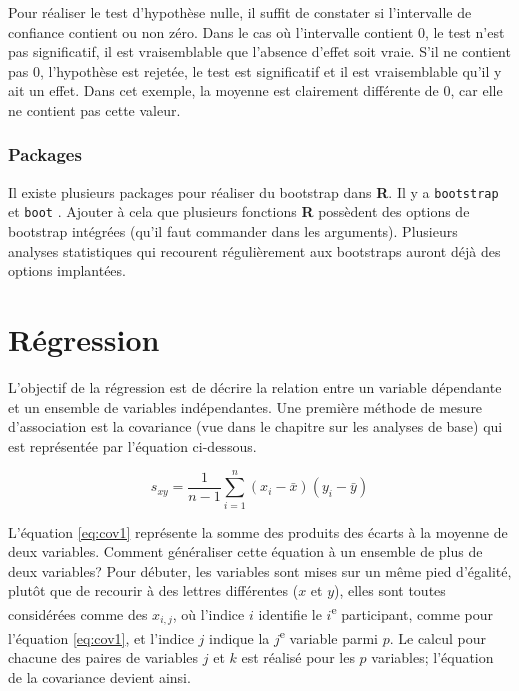 \documentclass[
]{book}
\begin{document}
Pour réaliser le test d'hypothèse nulle, il suffit de constater si l'intervalle de confiance contient ou non zéro. Dans le cas où l'intervalle contient 0, le test n'est pas significatif, il est vraisemblable que l'absence d'effet soit vraie. S'il ne contient pas 0, l'hypothèse est rejetée, le test est significatif et il est vraisemblable qu'il y ait un effet. Dans cet exemple, la moyenne est clairement différente de 0, car elle ne contient pas cette valeur.

\hypertarget{packages}{%
\subsection{Packages}\label{packages}}

Il existe plusieurs packages pour réaliser du bootstrap dans \textbf{R}. Il y a \texttt{bootstrap} \autocite{bootstrap} et \texttt{boot} \autocite{Canty21}. Ajouter à cela que plusieurs fonctions \textbf{R} possèdent des options de bootstrap intégrées (qu'il faut commander dans les arguments). Plusieurs analyses statistiques qui recourent régulièrement aux bootstraps auront déjà des options implantées.

\hypertarget{ruxe9gression}{%
\chapter{Régression}\label{ruxe9gression}}

L'objectif de la régression est de décrire la relation entre un variable dépendante et un ensemble de variables indépendantes. Une première méthode de mesure d'association est la covariance (vue dans le chapitre sur les analyses de base) qui est représentée par l'équation ci-dessous.

\begin{equation}
s_{xy}=\frac{1}{n-1}\sum_{i=1}^n(x_i-\bar{x})(y_i-\bar{y})
\label{eq:cov1}
\end{equation}

L'équation \eqref{eq:cov1} représente la somme des produits des écarts à la moyenne de deux variables. Comment généraliser cette équation à un ensemble de plus de deux variables? Pour débuter, les variables sont mises sur un même pied d'égalité, plutôt que de recourir à des lettres différentes (\(x\) et \(y\)), elles sont toutes considérées comme des \(x_{i,j}\), où l'indice \(i\) identifie le \(i\)\textsuperscript{e} participant, comme pour l'équation \eqref{eq:cov1}, et l'indice \(j\) indique la \(j\)\textsuperscript{e} variable parmi \(p\). Le calcul pour chacune des paires de variables \(j\) et \(k\) est réalisé pour les \(p\) variables; l'équation de la covariance devient ainsi.
\end{document}
